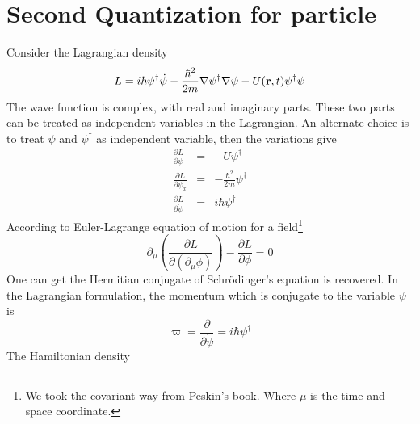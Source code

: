 \section{Second Quantization for particle} \label{s1.2}
Consider the Lagrangian density
\begin{equation}
    L = i\hbar \psi^\dagger \dot{\psi} - \frac{\hbar^2}{2m} \nabla \psi^\dagger \nabla \psi - U(\mathbf{r},t) \psi^\dagger \psi    \label{1.94}
\end{equation}
The wave function is complex, with real and imaginary parts.
These two parts can be treated as independent variables in the Lagrangian.
An alternate choice is to treat $\psi$ and $\psi^\dagger$ as independent variable, then the variations give
\begin{eqnarray}
    \frac{\partial L}{\partial \psi} &=& - U \psi^\dagger \label{1.95} \\
    \frac{\partial L}{\partial \psi_x} &=& - \frac{\hbar^2}{2m} \psi^\dagger \label{1.96} \\
    \frac{\partial L}{\partial \dot{\psi}} &=& i \hbar \psi^\dagger   \label{1.97}
\end{eqnarray}
According to Euler-Lagrange equation of motion for a field\footnote{We took the covariant way from Peskin's book. Where $\mu$ is the time and space coordinate.}
\begin{equation}
    \partial_\mu \left( \frac{\partial L}{\partial \left( \partial_\mu \phi \right) } \right) - \frac{\partial L}{\partial \phi} = 0 \label{1.98}
\end{equation}
One can get the Hermitian conjugate of Schr{\"o}dinger's equation is recovered.
In the Lagrangian formulation, the momentum which is conjugate to the variable $\psi$ is
\begin{equation}
    \varpi = \frac{\partial}{\partial \dot{\psi}} = i \hbar \psi^\dagger \label{1.100}
\end{equation}
The Hamiltonian density
